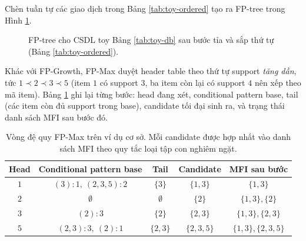 Chèn tuần tự các giao dịch trong Bảng \ref{tab:toy-ordered} tạo ra FP-tree trong Hình \ref{fig:fptree-toy-ex}.

\begin{figure}[H]
    \centering
    \caption{FP-tree cho CSDL toy Bảng \ref{tab:toy-db} sau bước tỉa và sắp thứ tự (Bảng \ref{tab:toy-ordered}).}
    \label{fig:fptree-toy-ex}
\end{figure}

Khác với FP-Growth, FP-Max duyệt header table theo thứ tự support \emph{tăng dần}, tức $1 \prec 2 \prec 3 \prec 5$ (item $1$ có support $3$, ba item còn lại có support $4$ nên xếp theo mã item). Bảng \ref{tab:toy-fpmax} ghi lại từng bước: head đang xét, conditional pattern base, tail (các item còn đủ support trong base), candidate tối đại sinh ra, và trạng thái danh sách MFI sau bước đó.

\begin{table}[H]
    \centering
    \caption{Vòng đệ quy FP-Max trên ví dụ cơ sở. Mỗi candidate được hợp nhất vào danh sách MFI theo quy tắc loại tập con nghiêm ngặt.}
    \label{tab:toy-fpmax}
    \small
    \begin{tabular}{c c c c c}
        \toprule
        Head & Conditional pattern base & Tail & Candidate & MFI sau bước \\
        \midrule
        $1$ & $(3):1,\ (2,3,5):2$ & $\{3\}$ & $\{1,3\}$ & $\{1,3\}$ \\
        $2$ & $\emptyset$ & $\emptyset$ & $\{2\}$ & $\{1,3\},\{2\}$ \\
        $3$ & $(2):3$ & $\{2\}$ & $\{2,3\}$ & $\{1,3\},\{2,3\}$ \\
        $5$ & $(2,3):3,\ (2):1$ & $\{2,3\}$ & $\{2,3,5\}$ & $\{1,3\},\{2,3,5\}$ \\
        \bottomrule
    \end{tabular}
\end{table}

